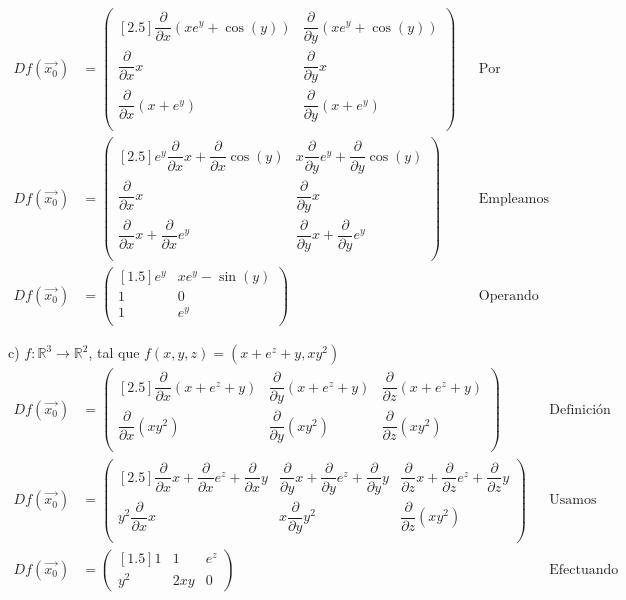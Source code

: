 \documentclass[letterpaper]{article}
\renewcommand{\d}{\partial}
\renewcommand{\*}{\cdot}
\theoremstyle{definition}
\begin{document}
\begin{align*}
	Df(\vec{x_0}) &= \begin{pmatrix}[2.5]
	\dfrac{\d}{\d x} (xe^y + \cos(y)) & \dfrac{\d}{\d y} (xe^y + \cos(y))\\
	\dfrac{\d}{\d x} x & \dfrac{\d}{\d y} x\\
	\dfrac{\d}{\d x} (x + e^y) & \dfrac{\d}{\d y}( x + e^y)\\
	\end{pmatrix} &&\text{Por definición de matriz de derivadas parciales}\\
	Df(\vec{x_0}) &= \begin{pmatrix}[2.5]
	  e^y\dfrac{\d}{\d x} x + \dfrac{\d}{\d x}\cos(y) & x\dfrac{\d}{\d y} e^y + \dfrac{\d}{\d y}\cos(y)\\
	\dfrac{\d}{\d x} x & \dfrac{\d}{\d y} x\\
	\dfrac{\d}{\d x} x + \dfrac{\d}{\d x}e^y & \dfrac{\d}{\d y} x + \dfrac{\d}{\d y}e^y\\
	\end{pmatrix} &&\text{Empleamos que la derivada es lineal, abre sumas y saca escalares}\\
	Df(\vec{x_0}) &= \begin{pmatrix}[1.5]
	e^y & x e^y - \sin(y)\\
	1 & 0\\
	1 & e^y\\
	\end{pmatrix} &&\text{Operando las derivadas}
\end{align*}

\noindent c) $f: \mathbb{R}^3  \longrightarrow \mathbb{R}^2$, tal que $f(x,y,z) = (x + e^z + y, xy^2)$
\begin{align*}
	Df(\vec{x_0}) &= \begin{pmatrix}[2.5]
	\dfrac{\d}{\d x} (x + e^z + y) & \dfrac{\d}{\d y} (x + e^z + y) & \dfrac{\d}{\d z} (x + e^z + y) \\
	\dfrac{\d}{\d x} (xy^2) & \dfrac{\d}{\d y}( xy^2) & \dfrac{\d}{\d z} (xy^2) \\
	\end{pmatrix} && \text{Definición de matriz de derivadas parciales}\\
	Df(\vec{x_0}) &= \begin{pmatrix}[2.5]
	\dfrac{\d}{\d x} x + \dfrac{\d}{\d x} e^z + \dfrac{\d}{\d x} y & \dfrac{\d}{\d y} x + \dfrac{\d}{\d y} e^z +\dfrac{\d}{\d y} y & \dfrac{\d}{\d z} x + \dfrac{\d}{\d z} e^z + \dfrac{\d}{\d z}y \\
	y^2\dfrac{\d}{\d x} x & x\dfrac{\d}{\d y}y^2 & \dfrac{\d}{\d z} (xy^2) \\
	\end{pmatrix} && \text{Usamos que la derivada es un operador lineal}\\
	Df(\vec{x_0}) &= \begin{pmatrix}[1.5]
	1& 1 & e^z \\
	y^2 & 2xy & 0 
	\end{pmatrix} && \text{Efectuando las derivadas parciales}
\end{align*}
\end{document}
